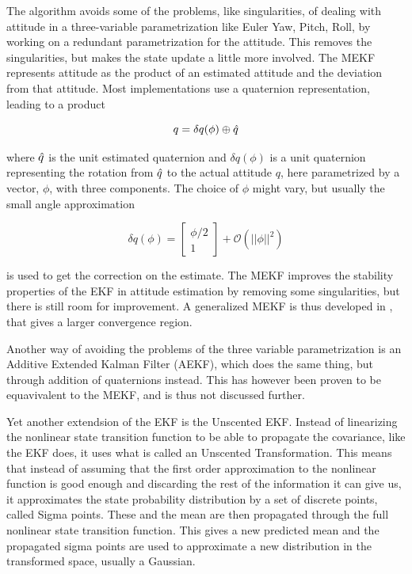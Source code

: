 The algorithm avoids some of the problems, like singularities, of dealing with attitude in a three-variable parametrization like Euler Yaw, Pitch, Roll, by working on a redundant parametrization for the attitude. This removes the singularities, but makes the state update a little more involved. The MEKF represents attitude as the product of an estimated attitude and the deviation from that attitude. Most implementations use a quaternion representation, leading to a product 

\begin{equation}
    q = \delta q(\phi)\oplus \Hat{q}
\end{equation}

where $\Hat{q}$ is the unit estimated quaternion and $\delta q(\phi)$ is a unit quaternion representing the rotation from $\Hat{q}$ to the actual attitude $q$, here parametrized by a vector, $\phi$, with three components. The choice of $\phi$ might vary, but usually the small angle approximation

\begin{equation}
    \delta q(\phi) = \begin{bmatrix} \phi / 2 \\ 1 \end{bmatrix} + \mathcal{O}(||\phi||^2)
\end{equation}

is used to get the correction on the estimate. The MEKF improves the stability properties of the EKF in attitude estimation by removing some singularities, but there is still room for improvement. A generalized MEKF is thus developed in \cite{GMEKF}, that gives a larger convergence region. 

Another way of avoiding the problems of the three variable parametrization is an Additive Extended Kalman Filter (AEKF), which does the same thing, but through addition of quaternions instead. This has however been proven to be equavivalent to the MEKF\cite{AEKF}, and is thus not discussed further.

Yet another extendsion of the EKF is the Unscented EKF\cite{UKF}. Instead of linearizing the nonlinear state transition function to be able to propagate the covariance, like the EKF does, it uses what is called an Unscented Transformation\cite{UTrans}. This means that instead of assuming that the first order approximation to the nonlinear function is good enough and discarding the rest of the information it can give us, it approximates the state probability distribution by a set of discrete points, called Sigma points. These and the mean are then propagated through the full nonlinear state transition function. This gives a new predicted mean and the propagated sigma points are used to approximate a new distribution in the transformed space, usually a Gaussian. 

